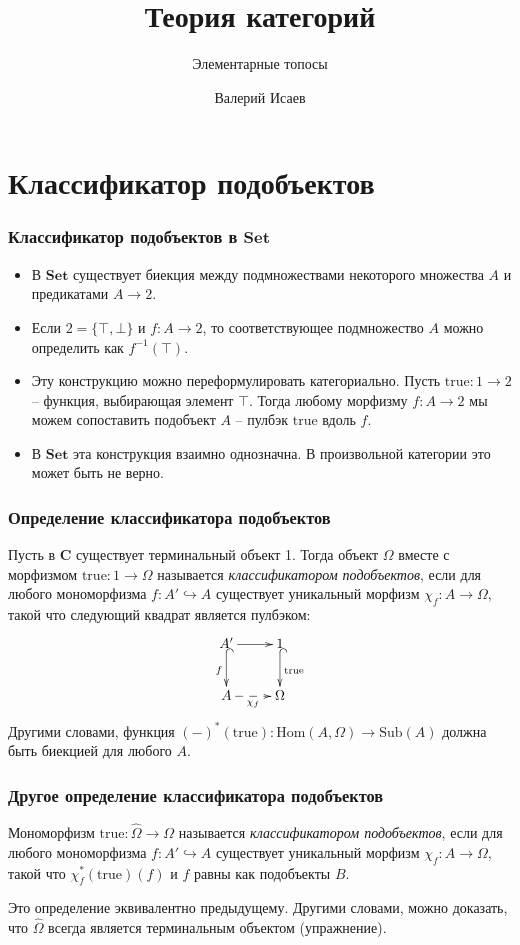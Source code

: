 \documentclass{beamer}
\theoremstyle{definition}
\newcommand{\cat}[1]{\mathbf{#1}}
\renewcommand{\C}{\cat{C}}
\newcommand{\Set}{\cat{Set}}
\newcommand{\fs}[1]{\mathrm{#1}}
\newcommand{\true}{\fs{true}}
\newcommand{\Hom}{\fs{Hom}}
\newcommand{\Sub}{\fs{Sub}}
\begin{document}
\title{Теория категорий}
\subtitle{Элементарные топосы}
\author{Валерий Исаев}
\maketitle

\section{Классификатор подобъектов}

\begin{frame}
\frametitle{Классификатор подобъектов в $\Set$}
\begin{itemize}
\item В $\Set$ существует биекция между подмножествами некоторого множества $A$ и предикатами $A \to 2$.
\item Если $2 = \{ \top, \bot \}$ и $f : A \to 2$, то соответствующее подмножество $A$ можно определить как $f^{-1}(\top)$.
\item Эту конструкцию можно переформулировать категориально.
Пусть $\true : 1 \to 2$ -- функция, выбирающая элемент $\top$.
Тогда любому морфизму $f : A \to 2$ мы можем сопоставить подобъект $A$ -- пулбэк $\true$ вдоль $f$.
\item В $\Set$ эта конструкция взаимно однозначна. В произвольной категории это может быть не верно.
\end{itemize}
\end{frame}

\begin{frame}
\frametitle{Определение классификатора подобъектов}
Пусть в $\C$ существует терминальный объект 1.
Тогда объект $\Omega$ вместе с морфизмом $\true : 1 \to \Omega$ называется \emph{классификатором подобъектов},
если для любого мономорфизма $f : A' \hookrightarrow A$ существует уникальный морфизм $\chi_f : A \to \Omega$, такой что следующий квадрат является пулбэком:
\[ \xymatrix{ A' \ar@{^{(}->}[d]_f \ar[r] & 1 \ar@{^{(}->}[d]^{\true} \\
              A \ar@{-->}[r]_{\chi_f} & \Omega
            } \]
Другими словами, функция $(-)^*(\fs{true}) : \Hom(A,\Omega) \to \Sub(A)$ должна быть биекцией для любого $A$.
\end{frame}

\begin{frame}
\frametitle{Другое определение классификатора подобъектов}
\begin{defn}
Мономорфизм $\true : \widehat{\Omega} \to \Omega$ называется \emph{классификатором подобъектов},
если для любого мономорфизма $f : A' \hookrightarrow A$ существует уникальный морфизм $\chi_f : A \to \Omega$, такой что $\chi_f^*(\fs{true})(f)$ и $f$ равны как подобъекты $B$.
\end{defn}
\begin{remark}
Это определение эквивалентно предыдущему.
Другими словами, можно доказать, что $\widehat{\Omega}$ всегда является терминальным объектом (упражнение).
\end{remark}
\end{frame}
\end{document}
